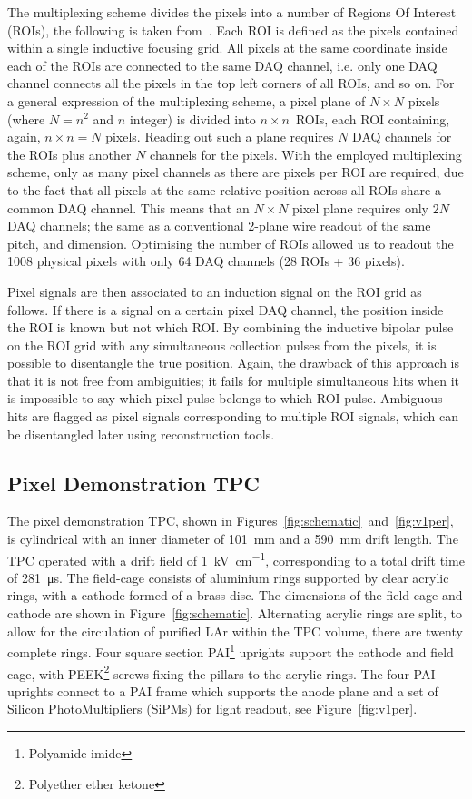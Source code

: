 \documentclass[instruments,article,submit,moreauthors,pdftex]{Definitions/mdpi}
\begin{document}
The multiplexing scheme divides the pixels into a number of Regions Of Interest (ROIs), the following is taken from~\cite{maplesyrup}.
Each ROI is defined as the pixels contained within a single inductive focusing grid.
All pixels at the same coordinate inside each of the ROIs are connected to the same DAQ channel, i.e. only one DAQ channel connects all the pixels in the top left corners of all ROIs, and so on. 
For a general expression of the multiplexing scheme, a pixel plane of $N \times N$ pixels (where $N = n ^ 2$ and $n$ integer) is divided into $n \times n$~ROIs, each ROI containing, again, $n \times n = N$ pixels.
Reading out such a plane requires $N$ DAQ channels for the ROIs plus another $N$ channels for the pixels.
With the employed multiplexing scheme, only as many pixel channels as there are pixels per ROI are required, due to the fact that all pixels at the same relative position across all ROIs share a common DAQ channel.
This means that an $N \times N$ pixel plane requires only $2 N$ DAQ channels; the same as a conventional 2-plane wire readout of the same pitch, and dimension.
Optimising the number of ROIs allowed us to readout the 1008 physical pixels with only 64 DAQ channels (28 ROIs + 36 pixels).

Pixel signals are then associated to an induction signal on the ROI grid as follows. 
If there is a signal on a certain pixel DAQ channel, the position inside the ROI is known but not which ROI.
By combining the inductive bipolar pulse on the ROI grid with any simultaneous collection pulses from the pixels, it is possible to disentangle the true position.
Again, the drawback of this approach is that it is not free from ambiguities; it fails for multiple simultaneous hits when it is impossible to say which pixel pulse belongs to which ROI pulse.
Ambiguous hits are flagged as pixel signals corresponding to multiple ROI signals, which can be disentangled later using reconstruction tools. 

\subsection{Pixel Demonstration TPC} \label{sec:viper}

The pixel demonstration TPC, shown in Figures~\ref{fig:schematic}~and~\ref{fig:v1per}, is cylindrical with an inner diameter of \SI{101}{\milli\metre} and a \SI{590}{\milli\metre} drift length. 
The TPC operated with a drift field of \SI{1}{\kilo\volt\per\centi\metre}, corresponding to a total drift time of \SI{281}{\micro\second}. 
The field-cage consists of aluminium rings supported by clear acrylic rings, with a cathode formed of a brass disc. 
The dimensions of the field-cage and cathode are shown in Figure~\ref{fig:schematic}.
Alternating acrylic rings are split, to allow for the circulation of purified LAr within the TPC volume, there are twenty complete rings.
Four square section PAI\footnote{Polyamide-imide} uprights support the cathode and field cage, with PEEK\footnote{Polyether ether ketone} screws fixing the pillars to the acrylic rings.
The four PAI uprights connect to a PAI frame which supports the anode plane and a set of  Silicon PhotoMultipliers (SiPMs) for light readout, see Figure~\ref{fig:v1per}. 
\end{document}
